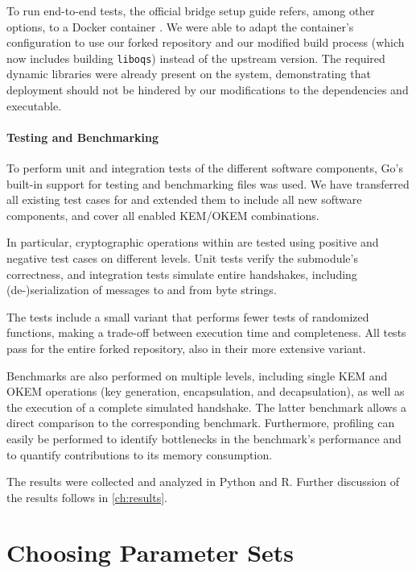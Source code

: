 To run end-to-end tests, the official bridge setup guide \cite{tor-bridge-setup} refers, among other options, to a Docker container \cite{tor-bridge-docker}.
We were able to adapt the container's configuration to use our forked repository and our modified build process (which now includes building \texttt{liboqs}) instead of the upstream version. The required dynamic libraries were already present on the system, demonstrating that deployment should not be hindered by our modifications to the dependencies and executable.

\paragraph{Testing and Benchmarking}

To perform unit and integration tests of the different software components, Go's built-in support for testing and benchmarking files was used. We have transferred all existing test cases for \obfsfour{} and extended them to include all new software components, and cover all enabled KEM/OKEM combinations.

In particular, cryptographic operations within \drivel{} are tested using positive and negative test cases on different levels. Unit tests verify the submodule's correctness, and integration tests simulate entire handshakes, including (de-)serialization of messages to and from byte strings.

The tests include a small variant that performs fewer tests of randomized functions, making a trade-off between execution time and completeness. All tests pass for the entire forked repository, also in their more extensive variant.

Benchmarks are also performed on multiple levels, including single KEM and OKEM operations (key generation, encapsulation, and decapsulation), as well as the execution of a complete simulated handshake. The latter benchmark allows a direct comparison to the corresponding \obfsfour{} benchmark. Furthermore, profiling can easily be performed to identify bottlenecks in the benchmark's performance and to quantify contributions to its memory consumption.

The results were collected and analyzed in Python and R. Further discussion of the results follows in \cref{ch:results}.

\section{Choosing Parameter Sets} \label{sec:parameters}

